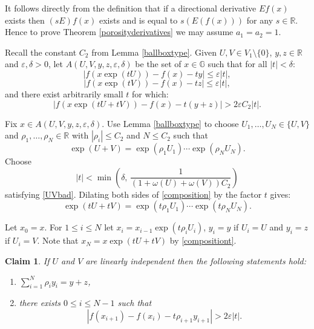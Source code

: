 \documentclass[reqno, 11pt]{amsart}
\newtheorem{claim}[theorem]{Claim}
\theoremstyle{definition}
\theoremstyle{remark}
\numberwithin{theorem}{section}
\numberwithin{equation}{section}
\begin{document}
It follows directly from the definition that if a directional derivative $Ef(x)$ exists then $(sE)f(x)$ exists and is equal to $s(E(f(x)))$ for any $s\in \mathbb{R}$. Hence to prove Theorem \ref{porosityderivatives} we may assume $a_{1}=a_{2}=1$.

Recall the constant $C_{2}$ from Lemma \ref{ballboxtype}. Given $U, V\in V_{1}\setminus \{0\}$, $y, z\in \mathbb{R}$ and $\varepsilon, \delta>0$, let $A(U,V,y,z,\varepsilon,\delta)$ be the set of $x\in \mathbb{G}$ such that for all $|t|<\delta$:
\begin{equation}\label{Ugood} |f(x\exp(tU))-f(x)-ty|\leq \varepsilon |t|,\end{equation}
\begin{equation}\label{Vgood} |f(x\exp(tV))-f(x)-tz|\leq \varepsilon |t|,\end{equation}
and there exist arbitrarily small $t$ for which:
\begin{equation}\label{UVbad}|f(x\exp(tU+tV))-f(x)-t(y+z)|> 2\varepsilon C_{2}|t|.\end{equation}

Fix $x\in A(U,V,y,z,\varepsilon,\delta)$. Use Lemma \ref{ballboxtype} to choose $U_{1}, \ldots, U_{N} \in \{ U, V\}$ and $\rho_{1}, \ldots, \rho_{N}\in \mathbb{R}$ with $|\rho_{i}|\leq C_{2}$ and $N\leq C_{2}$ such that
\begin{equation}\label{composition}
\exp(U+V)=\exp(\rho_{1}U_{1})\cdots \exp(\rho_{N}U_{N}).
\end{equation}
Choose 
\begin{equation}\label{tsmall}
|t|<\min \left( \delta,\, \frac{1}{(1+\omega(U)+\omega(V))C_{2}}\right)
\end{equation}
satisfying \eqref{UVbad}. Dilating both sides of \eqref{composition} by the factor $t$ gives:
\begin{equation}\label{compositiont} 
\exp(tU+tV)=\exp(t\rho_{1}U_{1})\cdots \exp(t\rho_{N}U_{N}).
\end{equation}

Let $x_{0}=x$. For $1\leq i\leq N$ let $x_{i}=x_{i-1}\exp (t\rho_{i}U_{i})$, $y_{i}=y$ if $U_{i}=U$ and $y_{i}=z$ if $U_{i}=V$. Note that $x_{N}=x\exp (tU+tV)$ by \eqref{compositiont}. 

\begin{claim}\label{claim1}
If $U$ and $V$ are linearly independent then the following statements hold:
\begin{enumerate}
\item $\sum_{i=1}^{N}\rho_{i}y_{i} =y+z$,
\item there exists $0\leq i\leq N-1$ such that
\[|f(x_{i+1})-f(x_{i})-t\rho_{i+1}y_{i+1}|>2\varepsilon |t|.\]
\end{enumerate}
\end{claim}
\end{document}

